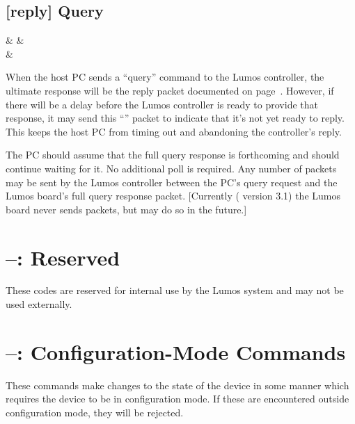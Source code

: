 \documentclass[letterpaper,twoside,onecolumn,openright,final]{memoir}
\begin{document}
\subsection{ [reply] Query }
\begin{BF}
	 &  &  \\
	 & 
\end{BF}
When the host PC sends a ``query'' command to the Lumos controller, the ultimate response will be
the reply packet documented on page~\pageref{bb:query-reply}.  However, if there will be a delay
before the Lumos controller is ready to provide that response, it may send this ``''
packet to indicate that it's not yet ready to reply.  This keeps the host PC from timing out and
abandoning the controller's reply.

The PC should assume that the full query response is forthcoming and should 
continue waiting for it.  No additional poll is required.  Any number of
 packets may be sent by the Lumos controller between the PC's
query request and the Lumos board's full query response packet.  [Currently
( version 3.1) the Lumos board never sends  packets,
but may do so in the future.]


\section{--: Reserved}
These codes are reserved for internal use by the Lumos system and may not be used externally.

\section{--: Configuration-Mode Commands}
These commands make changes to the state of the device in some manner which requires the device to
be in configuration mode.  If these are encountered outside configuration mode, they will be 
rejected.
\end{document}
